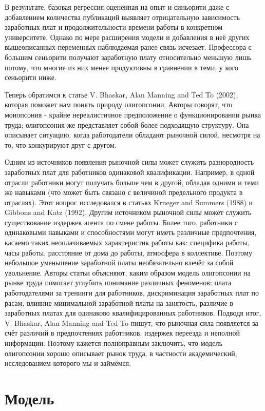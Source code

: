 \documentclass[a4paper, 12pt]{article}
\theoremstyle{definition}
\theoremstyle{plain}
\begin{document}
	В результате, базовая регрессия оценённая на опыт и синьорити даже с добавлением количества публикаций выявляет отрицательную зависимость заработных плат и продолжительности времени работы в конкретном университете. Однако по мере расширения модели и добавления в неё других вышеописанных переменных наблюдаемая ранее связь исчезает. Профессора с большим сеньорити получают заработную плату относительно меньшую лишь потому, что многие из них менее продуктивны в сравнении в теми, у кого сеньорити ниже.
	
	Теперь обратимся к статье V. Bhaskar, Alan Manning and Ted To (2002), которая поможет нам понять природу олигопсонии. Авторы говорят,  что монопсония - крайне нереалистичное предположение о функционировании рынка труда; олигопсония же представляет собой более подходящую структуру. Она описывает ситуацию, когда работодатели обладают рыночной силой, несмотря на то, что конкурируют друг с другом. 

	Одним из источников появления рыночной силы может служить разнородность заработных плат для работников одинаковой квалификации. Например, в одной отрасли работники могут получать больше чем в другой, обладая одними и теми же навыками (что может быть связано с величиной предельного продукта в отраслях). Этот вопрос исследовался в статьях Krueger and Summers (1988) и Gibbons and Katz (1992).
Другим источником рыночной силы может служить существование издержек агента по смене работы. Более того, работники с одинаковыми навыками и способностями могут иметь различные предпочтения, касаемо таких неоплачиваемых характеристик работы как: специфика работы, часы работы, расстояние от дома до работы, атмосфера в коллективе. Поэтому небольшое уменьшение заработной платы необязательно влечёт за собой увольнение.
Авторы статьи объясняют, каким образом модель олигопсонии на рынке труда помогает углубить понимание различных феноменов: плата работодателями за тренинги для работников, дискриминация заработных плат по расам, влияние минимальной заработной платы на занятость, различие в заработных платах для одинаково квалифицированных работников. Подводя итог, V. Bhaskar, Alan Manning and Ted To пишут, что рыночная сила появляется за счёт различий в предпочтениях работников, издержек переезда и неполной информации. Поэтому кажется полноправным заключить, что модель олигопсонии хорошо описывает рынок труда, в частности академический, исследованием которого мы и займёмся.

\section{Модель}
\end{document}
